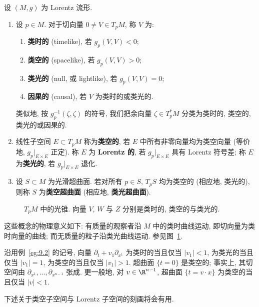 \begin{definition}[切向量与子空间的因果特征]\label{def:9.3}
设 $(M, g)$ 为 Lorentz 流形.
\begin{enumerate}
    \item 设 $p \in M$. 对于切向量 $0 \neq V \in T_p M$, 称 $V$ 为:
    \begin{enumerate}
        \item \textbf{类时的} (timelike), 若 $g_p(V, V) < 0$;
        \item \textbf{类空的} (spacelike), 若 $g_p(V, V) > 0$;
        \item \textbf{类光的} (null, 或 lightlike), 若 $g_p(V, V) = 0$;
        \item \textbf{因果的} (causal), 若 $V$ 为类时的或类光的.
    \end{enumerate}
    类似地, 按 $g_p^{-1}(\zeta, \zeta)$ 的符号, 我们把余向量 $\zeta \in T_p^* M$ 分类为类时的, 类空的, 类光的或因果的.
    \item 线性子空间 $E \subset T_p M$ 称为\textbf{类空的}, 若 $E$ 中所有非零向量均为类空向量 (等价地, $g_p|_{E \times E}$ 正定). 称 $E$ 为 \textbf{Lorentz 的}, 若 $g_p|_{E \times E}$ 具有 Lorentz 符号差; 称 $E$ 为\textbf{类光的}, 若 $g_p|_{E \times E}$ 退化.
    \item 设 $S \subset M$ 为光滑超曲面. 若对所有 $p \in S$, $T_p S$ 均为类空的 (相应地, 类光的), 则称 $S$ 为\textbf{类空超曲面} (相应地, \textbf{类光超曲面}).
\end{enumerate}
\end{definition}

\begin{figure}[htbp]
\centering
\drawFigNineOne
\caption{$T_p M$ 中的光锥. 向量 $V$, $W$ 与 $Z$ 分别是类时的, 类空的与类光的.}\label{fig:9.1}
\end{figure}

这些概念的物理意义如下: 有质量的观察者沿 $M$ 中的类时曲线运动, 即切向量为类时向量的曲线; 而无质量的粒子沿类光曲线运动. 参见图~\ref{fig:9.1}.

\begin{example}[因果特征]\label{eg:9.4}
沿用例~\ref{eg:9.2} 的记号, 向量 $\partial_t + v_1 \partial_{x^1}$ 为类时的当且仅当 $|v_1| < 1$, 为类光的当且仅当 $|v_1| = 1$, 为类空的当且仅当 $|v_1| > 1$. 超曲面 $\{t = 0\}$ 是类空的; 事实上, 其切空间由 $\partial_{x^1}, \ldots, \partial_{x^{n-1}}$ 张成. 更一般地, 对 $v \in \R^{n-1}$, 超曲面 $\{t = v \cdot x\}$ 为类空的当且仅当 $|v| < 1$.
\end{example}

下述关于类空子空间与 Lorentz 子空间的刻画将会有用.

